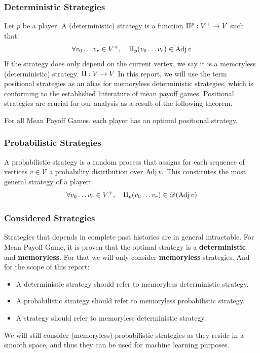 \subsubsection{Deterministic Strategies}
Let $p$ be a player. \newline 
A (deterministic) strategy is a function $\Pi^{p}:V^+\rightarrow V$ such that:
$$
\forall v_0\dots v_r\in V^+, \quad \Pi_p(v_0\dots v_r) \in \operatorname{Adj} v
$$	
If the strategy does only depend on the current vertex, we say it is a memoryless (deterministic) strategy.  $\Pi:V\rightarrow V$
\newline In this report, we will use the term positional strategies as an alias for memoryless deterministic strategies, which is conforming to the established litterature of mean payoff games.
\newline Positional strategies are crucial for our analysis as a result of the following theorem.
\begin{theorem}
	\label{theorem:OptimalStrategy}
	For all Mean Payoff Games, each player has an optimal positional strategy.
\end{theorem}

\subsubsection{Probabilistic Strategies}
A probabilistic strategy is a random process that assigns for each sequence of vertices $v\in\mathcal{V}$ a probability distribution over $\operatorname{Adj} v.$ This constitutes the most general strategy of a player:
$$
\forall v_0\dots v_r\in V^+, \quad \Pi_p(v_0\dots v_r) \in \mathscr{D}(\operatorname{Adj} v)
$$
\subsubsection{Considered Strategies}
Strategies that depends in complete past histories are in general intractable. For Mean Payoff Game, it is proven that the optimal strategy is a \textbf{deterministic} and \textbf{memoryless}.
\newline For that we will only consider \textbf{memoryless} strategies. And for the scope of this report:
\begin{itemize}
	\item A deterministic strategy should refer to memoryless deterministic strategy.
	\item A probabilistic strategy should refer to memoryless probabilistic strategy.
	\item A strategy should refer to memoryless deterministic strategy.
\end{itemize}
We will still consider (memoryless) probabilistic strategies as they reside in a smooth space, and thus they can be used for machine learning purposes.
